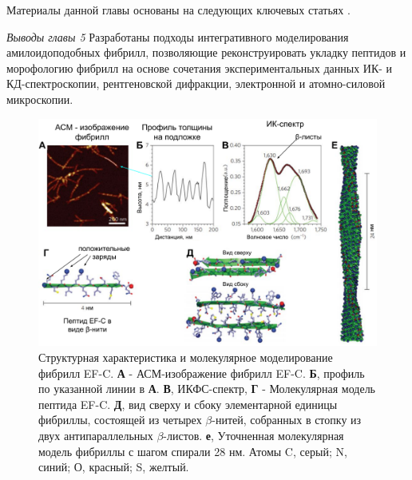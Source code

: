 Материалы данной главы основаны на следующих ключевых статьях \cite{shaytan_self-assembling_2011,shaytan_self-organizing_2011,yolamanova_peptide_2013}. 

\textit{Выводы главы 5} \newline
Разработаны подходы интегративного моделирования амилоидоподобных фибрилл, позволяющие реконструировать укладку пептидов и морофологию фибрилл на основе сочетания экспериментальных данных ИК- и КД-спектроскопии, рентгеновской дифракции, электронной и атомно-силовой микроскопии.

\begin{figure} [H]
    \centering
    \includegraphics[width=\textwidth]{images/p4/natnanotech2013/nn2013/nn2013_f2.pdf}
    \caption[Структурная характеристика и молекулярное моделирование фибрилл EF-C]{Структурная характеристика и молекулярное моделирование фибрилл EF-C. \textbf{А} - АСМ-изображение фибрилл EF-C. \textbf{Б}, профиль по указанной линии в \textbf{А}. \textbf{В}, ИКФС-спектр, \textbf{Г} - Молекулярная модель пептида EF-C. \textbf{Д}, вид  сверху и сбоку элементарной единицы фибриллы, состоящей из четырех $\beta$-нитей, собранных в стопку из двух антипараллельных $\beta$-листов. \textbf{е}, Уточненная молекулярная модель фибриллы с шагом спирали 28 нм. Атомы C, серый; N, синий; О, красный; S, желтый.}
    \label{fig:p4_nn2013_f2}
\end{figure}




